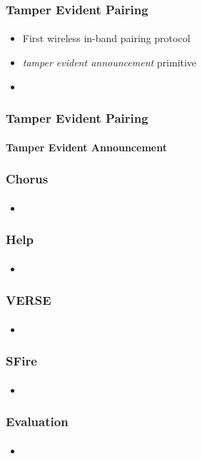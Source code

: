 \documentclass{beamer}
\begin{document}
\begin{frame}
	\frametitle{Tamper Evident Pairing}
	\framesubtitle{}
	\begin{itemize}
		\item First wireless in-band pairing protocol
		\item \textit{tamper evident announcement} primitive
		\item 
	\end{itemize}
\end{frame}

\begin{frame}
	\frametitle{Tamper Evident Pairing}
	\framesubtitle{Tamper Evident Announcement}
	\graphicspath{}
\end{frame}

\begin{frame}
	\frametitle{Chorus}
	\framesubtitle{}
	\begin{itemize}
		\item 
	\end{itemize}
\end{frame}

\begin{frame}
	\frametitle{Help}
	\framesubtitle{}
	\begin{itemize}
		\item 
	\end{itemize}
\end{frame}

\begin{frame}
	\frametitle{VERSE}
	\framesubtitle{}
	\begin{itemize}
		\item 
	\end{itemize}
\end{frame}

\begin{frame}
	\frametitle{SFire}
	\framesubtitle{}
	\begin{itemize}
		\item 
	\end{itemize}
\end{frame}

\begin{frame}
	\frametitle{Evaluation}
	\framesubtitle{}
	\begin{itemize}
		\item 
	\end{itemize}
\end{frame}
\end{document}
